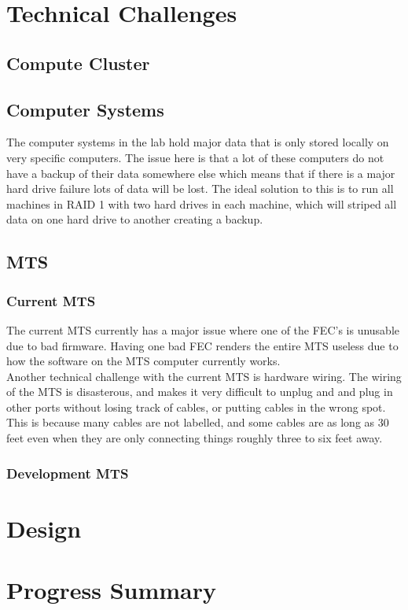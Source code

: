 \documentclass[12pt]{article}
\newcommand\tab[1][1cm]{\hspace*{#1}}
\begin{document}
\section{Technical Challenges}
\subsection{Compute Cluster}
\subsection{Computer Systems}
\tab The computer systems in the lab hold major data that is only stored locally on very specific computers. The issue here is that a lot of these computers do not have a backup of their data somewhere else which means that if there is a major hard drive failure lots of data will be lost. The ideal solution to this is to run all machines in RAID 1 with two hard drives in each machine, which will striped all data on one hard drive to another creating a backup. 
\subsection{MTS}
\subsubsection{Current MTS}
\tab The current MTS currently has a major issue where one of the FEC's is unusable due to bad firmware. Having one bad FEC renders the entire MTS useless due to how the software on the MTS computer currently works. \\
\tab Another technical challenge with the current MTS is hardware wiring. The wiring of the MTS is disasterous, and makes it very difficult to unplug and and plug in other ports without losing track of cables, or putting cables in the wrong spot. This is because many cables are not labelled, and some cables are as long as 30 feet even when they are only connecting things roughly three to six feet away.
\subsubsection{Development MTS}

 
\section{Design}

\section{Progress Summary}
\end{document}
